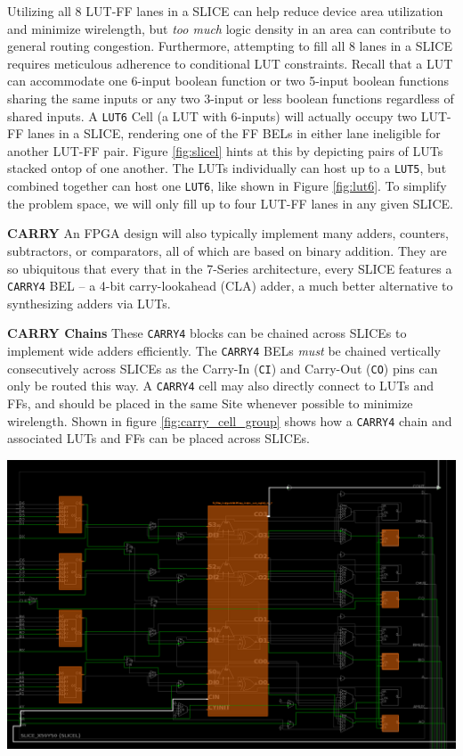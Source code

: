 \begin{multicols}{2}
Utilizing all 8 LUT-FF lanes in a SLICE can help reduce device area utilization and minimize wirelength, but \emph{too much} logic density in an area can contribute to general routing congestion. 
Furthermore, attempting to fill all 8 lanes in a SLICE requires meticulous adherence to conditional LUT constraints. 
Recall that a LUT can accommodate one 6-input boolean function or two 5-input boolean functions sharing the same inputs or any two 3-input or less boolean functions regardless of shared inputs. 
A \texttt{LUT6} Cell (a LUT with 6-inputs) will actually occupy two LUT-FF lanes in a SLICE, rendering one of the FF BELs in either lane ineligible for another LUT-FF pair. 
Figure \ref{fig:slicel} hints at this by depicting pairs of LUTs stacked ontop of one another. 
The LUTs individually can host up to a \texttt{LUT5}, but combined together can host one \texttt{LUT6}, like shown in Figure \ref{fig:lut6}.
To simplify the problem space, we will only fill up to four LUT-FF lanes in any given SLICE. 


\textbf{CARRY} \quad
An FPGA design will also typically implement many adders, counters, subtractors, or comparators, all of which are based on binary addition. 
They are so ubiquitous that every that in the 7-Series architecture, every SLICE features a \texttt{CARRY4} BEL -- a 4-bit carry-lookahead (CLA) adder, a much better alternative to synthesizing adders via LUTs. 

\textbf{CARRY Chains} \quad
These \texttt{CARRY4} blocks can be chained across SLICEs to implement wide adders efficiently. 
The \texttt{CARRY4} BELs \emph{must} be chained vertically consecutively across SLICEs as the Carry-In (\texttt{CI}) and Carry-Out (\texttt{CO}) pins can only be routed this way. 
A \texttt{CARRY4} cell may also directly connect to LUTs and FFs, and should be placed in the same Site whenever possible to minimize wirelength. 
Shown in figure \ref{fig:carry_cell_group} shows how a \texttt{CARRY4} chain and associated LUTs and FFs can be placed across SLICEs. 


{
    \centering
    \includegraphics[width=\columnwidth]{figures/carry_cell_group.png}
    \label{fig:carry_cell_group}
}


\end{multicols}
